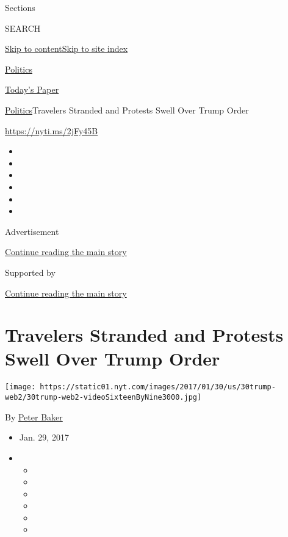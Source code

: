 Sections

SEARCH

\protect\hyperlink{site-content}{Skip to
content}\protect\hyperlink{site-index}{Skip to site index}

\href{https://www.nytimes.com/section/politics}{Politics}

\href{https://myaccount.nytimes.com/auth/login?response_type=cookie\&client_id=vi}{}

\href{https://www.nytimes.com/section/todayspaper}{Today's Paper}

\href{/section/politics}{Politics}\textbar{}Travelers Stranded and
Protests Swell Over Trump Order

\url{https://nyti.ms/2jFy45B}

\begin{itemize}
\item
\item
\item
\item
\item
\item
\end{itemize}

Advertisement

\protect\hyperlink{after-top}{Continue reading the main story}

Supported by

\protect\hyperlink{after-sponsor}{Continue reading the main story}

\hypertarget{travelers-stranded-and-protests-swell-over-trump-order}{%
\section{Travelers Stranded and Protests Swell Over Trump
Order}\label{travelers-stranded-and-protests-swell-over-trump-order}}

\texttt{[image: https://static01.nyt.com/images/2017/01/30/us/30trump-web2/30trump-web2-videoSixteenByNine3000.jpg]}

By \href{http://www.nytimes.com/by/peter-baker}{Peter Baker}

\begin{itemize}
\item
  Jan. 29, 2017
\item
  \begin{itemize}
  \item
  \item
  \item
  \item
  \item
  \item
  \end{itemize}
\end{itemize}


